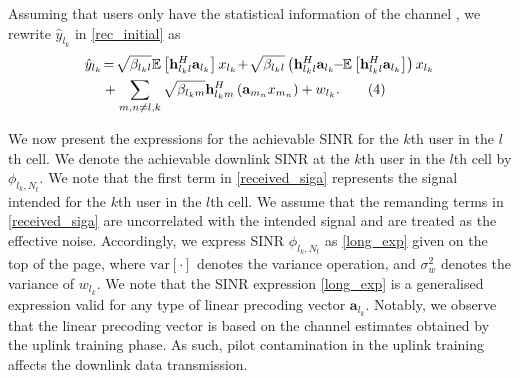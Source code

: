 \documentclass[conference]{IEEEtran}
\begin{document}
Assuming that users only have the statistical information of the channel \cite{Jose2011,Shen2015}, we rewrite $\hat{y}_{l_{k}}$ in \eqref{rec_initial} as
\begin{align}\label{received_siga}
\hat{y}_{l_{k}}&\!=\!\sqrt{\beta_{l_{k}l}}\mathbb{E}\left[\mathbf{h}_{l_{k}l}^H\mathbf{a}_{l_{k}}\right]x_{l_{k}} \!+\!\sqrt{\beta_{l_{k}l}}\left({\mathbf{h}_{l_{k}l}^H\mathbf{a}_{l_{k}}}
\!\!-\!\!\mathbb{E}\left[{\mathbf{h}_{l_{k}l}^H\mathbf{a}_{l_{k}}}\right]\right)x_{l_{k}} \notag \\
&+ \sum_{m,n \neq l,k}\sqrt{\beta_{l_{k}m}}\mathbf{h}_{l_{k}m}^{H}\left(\mathbf{a}_{m_{n}}x_{m_{n}}\right)+w_{l_{k}}. \tag{4}
\end{align}

We now present the expressions for the achievable SINR for the $k$th user in the $l$th cell. We denote the achievable downlink SINR at the $k$th user in the $l$th cell by $\phi_{l_{k},N_{t}}$. We note that the first term in \eqref{received_siga} represents the signal intended for the $k$th user in the $l$th cell. We assume that the remanding terms in \eqref{received_siga} are uncorrelated with the intended signal and are treated as the effective noise. Accordingly, we express SINR $\phi_{l_{k},N_{t}}$ as \eqref{long_exp} given on the top of the page,
where $\textrm{var}\left[\cdot\right]$ denotes the variance operation, and $\sigma_{w}^2$ denotes the variance of $w_{l_{k}}$. We note that the SINR expression \eqref{long_exp} is a generalised expression valid for any type of linear precoding vector $\mathbf{a}_{l_{k}}$. Notably, we observe that the linear precoding vector is based on the channel estimates obtained by the uplink training phase. As such, pilot contamination in the uplink training affects the downlink data transmission.
\end{document}
